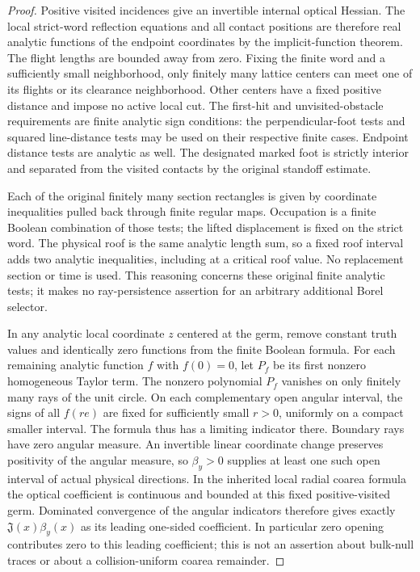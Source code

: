 \begin{proof}
Positive visited incidences give an invertible internal optical
Hessian. The local strict-word reflection equations and all contact
positions are therefore real analytic functions of the endpoint
coordinates by the implicit-function theorem. The flight lengths
are bounded away from zero. Fixing the finite word and a sufficiently
small neighborhood, only finitely many lattice centers can meet
one of its flights or its clearance neighborhood. Other centers
have a fixed positive distance and impose no active local cut.
The first-hit and unvisited-obstacle requirements are finite
analytic sign conditions: the perpendicular-foot tests and squared
line-distance tests may be used on their respective finite cases.
Endpoint distance tests are analytic as well. The designated
marked foot is strictly interior and separated from the visited
contacts by the original standoff estimate.

Each of the original finitely many section rectangles is given by
coordinate inequalities pulled back through finite regular maps.
Occupation is a finite Boolean combination of those tests; the
lifted displacement is fixed on the strict word. The physical roof
is the same analytic length sum, so a fixed roof interval adds two
analytic inequalities, including at a critical roof value. No
replacement section or time is used. This reasoning concerns
these original finite analytic tests; it makes no ray-persistence
assertion for an arbitrary additional Borel selector.

In any analytic local coordinate $z$ centered at the germ, remove
constant truth values and identically zero functions from the finite
Boolean formula. For each remaining analytic function $f$ with
$f(0)=0$, let $P_f$ be its first nonzero homogeneous Taylor term.
The nonzero polynomial $P_f$ vanishes on only finitely many rays
of the unit circle. On each complementary open angular interval,
the signs of all $f(re)$ are fixed for sufficiently small $r>0$,
uniformly on a compact smaller interval. The formula thus has a
limiting indicator there. Boundary rays have zero angular measure.
An invertible linear coordinate change preserves positivity of the
angular measure, so $\beta_y>0$ supplies at least one such open
interval of actual physical directions. In the inherited local radial
coarea formula the optical coefficient is continuous and bounded
at this fixed positive-visited germ. Dominated convergence of the
angular indicators therefore gives exactly
$\mathfrak J(x)\beta_y(x)$ as its leading one-sided coefficient.
In particular zero opening contributes zero to this leading
coefficient; this is not an assertion about bulk-null traces or
about a collision-uniform coarea remainder.


\end{proof}
